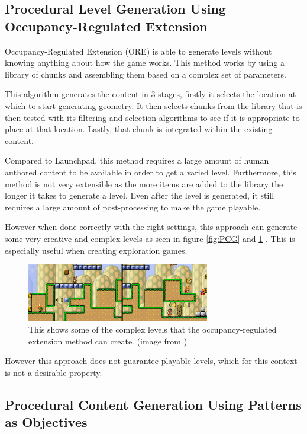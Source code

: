 \documentclass{scrartcl}
\begin{document}
\subsection{Procedural Level Generation Using Occupancy-Regulated Extension}

Occupancy-Regulated Extension (ORE) is able to generate levels without knowing anything about how the game works. This method works by using a library of chunks and assembling them based on a complex set of parameters. 

This algorithm generates the content in 3 stages, firstly it selects the location at which to start generating geometry. It then selects chunks from the library that is then tested with its filtering and selection algorithms to see if it is appropriate to place at that location. Lastly, that chunk is integrated within the existing content.

Compared to Launchpad, this method requires a large amount of human authored content to be available in order to get a varied level. Furthermore, this method is not very extensible as the more items are added to the library the longer it takes to generate a level. Even after the level is generated, it still requires a large amount of post-processing to make the game playable.\cite{mawhorter2010}

However when done correctly with the right settings, this approach can generate some very creative and complex levels as seen in figure \ref{fig:PCG} and \ref{fig:ocupancyfig2} . This is especially useful when creating exploration games.

\begin{figure}[t]
\includegraphics[width=8cm]{occupancy-complex}
\centering
    \caption{This shows some of the complex levels that the occupancy-regulated extension method can create. (image from \cite{mawhorter2010})}
    \label{fig:ocupancyfig2}
\end{figure}


However this approach does not guarantee playable levels, which for this context is not a desirable property.

\subsection{Procedural Content Generation Using Patterns as Objectives}
\end{document}
